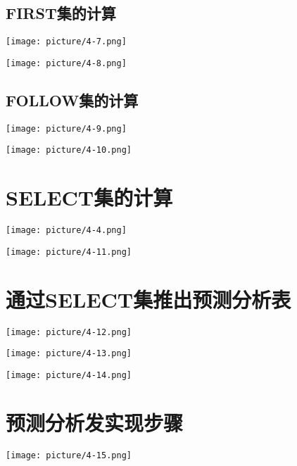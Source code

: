 \documentclass[UTF8]{article}
\begin{document}
 \subsection{FIRST集的计算}%
 \label{sub:first集的计算}

 \texttt{[image: picture/4-7.png]}
 
 \texttt{[image: picture/4-8.png]}

 \subsection{FOLLOW集的计算}%
 \label{sub:follow集的计算}

 \texttt{[image: picture/4-9.png]}
 
 \texttt{[image: picture/4-10.png]}

 \section{SELECT集的计算}%
 \label{sec:select集的计算}

 \texttt{[image: picture/4-4.png]}
 
 \texttt{[image: picture/4-11.png]}

 \section{通过SELECT集推出预测分析表}%
 \label{sec:通过select集推出预测分析表}

 \texttt{[image: picture/4-12.png]}
 
 \texttt{[image: picture/4-13.png]}
 
 \texttt{[image: picture/4-14.png]}
 \section{预测分析发实现步骤}%
 \label{sec:预测分析发实现步骤}
 
 \texttt{[image: picture/4-15.png]}
 
 
 
\end{document}
